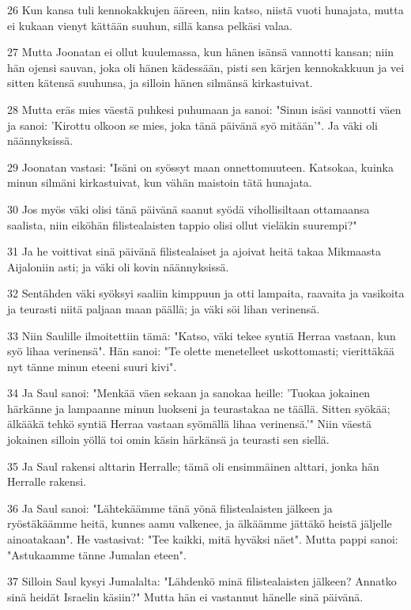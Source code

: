 \par 26 Kun kansa tuli kennokakkujen ääreen, niin katso, niistä vuoti hunajata, mutta ei kukaan vienyt kättään suuhun, sillä kansa pelkäsi valaa.
\par 27 Mutta Joonatan ei ollut kuulemassa, kun hänen isänsä vannotti kansan; niin hän ojensi sauvan, joka oli hänen kädessään, pisti sen kärjen kennokakkuun ja vei sitten kätensä suuhunsa, ja silloin hänen silmänsä kirkastuivat.
\par 28 Mutta eräs mies väestä puhkesi puhumaan ja sanoi: "Sinun isäsi vannotti väen ja sanoi: 'Kirottu olkoon se mies, joka tänä päivänä syö mitään'". Ja väki oli näännyksissä.
\par 29 Joonatan vastasi: "Isäni on syössyt maan onnettomuuteen. Katsokaa, kuinka minun silmäni kirkastuivat, kun vähän maistoin tätä hunajata.
\par 30 Jos myös väki olisi tänä päivänä saanut syödä vihollisiltaan ottamaansa saalista, niin eiköhän filistealaisten tappio olisi ollut vieläkin suurempi?"
\par 31 Ja he voittivat sinä päivänä filistealaiset ja ajoivat heitä takaa Mikmaasta Aijaloniin asti; ja väki oli kovin näännyksissä.
\par 32 Sentähden väki syöksyi saaliin kimppuun ja otti lampaita, raavaita ja vasikoita ja teurasti niitä paljaan maan päällä; ja väki söi lihan verinensä.
\par 33 Niin Saulille ilmoitettiin tämä: "Katso, väki tekee syntiä Herraa vastaan, kun syö lihaa verinensä". Hän sanoi: "Te olette menetelleet uskottomasti; vierittäkää nyt tänne minun eteeni suuri kivi".
\par 34 Ja Saul sanoi: "Menkää väen sekaan ja sanokaa heille: 'Tuokaa jokainen härkänne ja lampaanne minun luokseni ja teurastakaa ne täällä. Sitten syökää; älkääkä tehkö syntiä Herraa vastaan syömällä lihaa verinensä.'" Niin väestä jokainen silloin yöllä toi omin käsin härkänsä ja teurasti sen siellä.
\par 35 Ja Saul rakensi alttarin Herralle; tämä oli ensimmäinen alttari, jonka hän Herralle rakensi.
\par 36 Ja Saul sanoi: "Lähtekäämme tänä yönä filistealaisten jälkeen ja ryöstäkäämme heitä, kunnes aamu valkenee, ja älkäämme jättäkö heistä jäljelle ainoatakaan". He vastasivat: "Tee kaikki, mitä hyväksi näet". Mutta pappi sanoi: "Astukaamme tänne Jumalan eteen".
\par 37 Silloin Saul kysyi Jumalalta: "Lähdenkö minä filistealaisten jälkeen? Annatko sinä heidät Israelin käsiin?" Mutta hän ei vastannut hänelle sinä päivänä.
